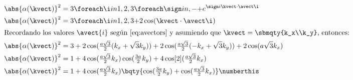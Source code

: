 \begin{align*}
\abs{\alpha(\kvect)}^2 &= 3\foreach \i in {1,2,3}\foreach \sign in {,-}{+e^{\sign i\kvect\cdot\avect\i}} \\
\abs{\alpha(\kvect)}^2 &= 3\foreach \i in {1,2,3}{+2\cos(\kvect\cdot\avect\i)}\\*
\intertext{Recordando los valores $ \avect{i} $ según \eqref{eq:avectors} y 
	asumiendo que $ \kvect=\sbmqty{k_x\\k_y} $, entonces:}
\abs{\alpha(\kvect)}^2 &= 3 + 2\cos(\tfrac{a\sqrt3}{2}(k_x+\sqrt3k_y)) + 2\cos(\tfrac{a\sqrt3}{2}(-k_x+\sqrt3k_y)) %
+ 2\cos(a\sqrt3k_x)
\\
\abs{\alpha(\kvect)}^2 &= 1 + 4\cos(\tfrac{a\sqrt3}{2}k_x)\cos(\tfrac{3a}{2}k_y) + 4\cos[2](\tfrac{a\sqrt3}{2}k_x)\\
\abs{\alpha(\kvect)}^2 &= 1 + 4\cos(\tfrac{a\sqrt3}{2}k_x)\bqty{\cos(\tfrac{3a}{2}k_y) + \cos(\tfrac{a\sqrt3}{2}k_x)} \numberthis\label{eq:phasefactmodsqr}
\end{align*}

